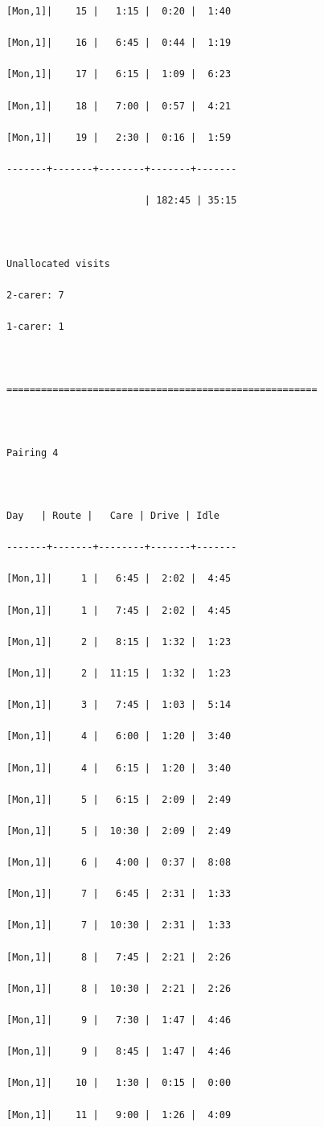 \documentclass[11pt,twoside]{article}
\numberwithin{Theorem}{section}
\numberwithin{Definition}{section}
\numberwithin{Lemma}{section}
\numberwithin{Algorithm}{section}
\numberwithin{equation}{section}
\begin{document}
\begin{verbatim}
[Mon,1]|    15 |   1:15 |  0:20 |  1:40

[Mon,1]|    16 |   6:45 |  0:44 |  1:19

[Mon,1]|    17 |   6:15 |  1:09 |  6:23

[Mon,1]|    18 |   7:00 |  0:57 |  4:21

[Mon,1]|    19 |   2:30 |  0:16 |  1:59

-------+-------+--------+-------+-------

                        | 182:45 | 35:15

 

Unallocated visits

2-carer: 7

1-carer: 1

 

======================================================

 

Pairing 4

 

Day   | Route |   Care | Drive | Idle

-------+-------+--------+-------+-------

[Mon,1]|     1 |   6:45 |  2:02 |  4:45

[Mon,1]|     1 |   7:45 |  2:02 |  4:45

[Mon,1]|     2 |   8:15 |  1:32 |  1:23

[Mon,1]|     2 |  11:15 |  1:32 |  1:23

[Mon,1]|     3 |   7:45 |  1:03 |  5:14

[Mon,1]|     4 |   6:00 |  1:20 |  3:40

[Mon,1]|     4 |   6:15 |  1:20 |  3:40

[Mon,1]|     5 |   6:15 |  2:09 |  2:49

[Mon,1]|     5 |  10:30 |  2:09 |  2:49

[Mon,1]|     6 |   4:00 |  0:37 |  8:08

[Mon,1]|     7 |   6:45 |  2:31 |  1:33

[Mon,1]|     7 |  10:30 |  2:31 |  1:33

[Mon,1]|     8 |   7:45 |  2:21 |  2:26

[Mon,1]|     8 |  10:30 |  2:21 |  2:26

[Mon,1]|     9 |   7:30 |  1:47 |  4:46

[Mon,1]|     9 |   8:45 |  1:47 |  4:46

[Mon,1]|    10 |   1:30 |  0:15 |  0:00

[Mon,1]|    11 |   9:00 |  1:26 |  4:09


\end{verbatim}
\end{document}
